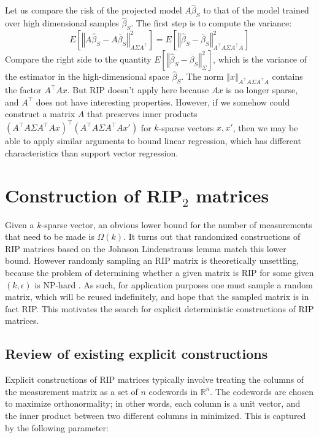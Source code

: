 \documentclass[english]{article}
\theoremstyle{plain}
\begin{document}
Let us compare the risk of the projected model $A\widehat{\beta}_{S}$ to that of the model trained over high dimensional samples $\widehat{\beta}_S$.
The first step is to compute the variance:
\[
E\left[\left\Vert A\widehat{\beta}_{S}-A\overline{\beta}_{S}\right\Vert _{A\Sigma A^{\top}}^{2}\right]=E\left[\left\Vert \widehat{\beta}_{S}-\overline{\beta}_{S}\right\Vert _{A^{\top}A\Sigma A^{\top}A}^{2}\right]
\] 
Compare the right side to the quantity $E\left[\left\Vert \widehat{\beta}_{S}-\overline{\beta}_{S}\right\Vert _{\Sigma}^{2}\right]$, which is the variance of the estimator in the high-dimensional space $\widehat{\beta}_S$.
The norm $\left\Vert x \right\Vert_{A^\top A \Sigma A^\top A}$ contains the factor $A^\top Ax$.
But RIP doesn't apply here because $Ax$ is no longer sparse, and $A^\top$ does not have interesting properties.
However, if we somehow could construct a matrix $A$ that preserves inner products $(A^{\top}A\Sigma A^{\top}Ax)^\top(A^{\top}A\Sigma A^{\top}Ax')$ for $k$-sparse vectors $x,x'$, then we may be able to apply similar arguments to bound linear regression, which has different characteristics than support vector regression.

\section{Construction of RIP$_2$ matrices}

Given a $k$-sparse vector, an obvious lower bound for the number of measurements that need to be made is $\Omega(k)$. It turns out that randomized constructions of RIP matrices based on the Johnson Lindenstrauss lemma match this lower bound. However randomly sampling an RIP matrix is theoretically unsettling, because the problem of determining whether a given matrix is RIP for some given $(k,\epsilon)$ is NP-hard \cite{Bandeira12}. As such, for application purposes one must sample a random matrix, which will be reused indefinitely, and hope that the sampled matrix is in fact RIP. This motivates the search for explicit deterministic constructions of RIP matrices. 

\subsection{Review of existing explicit constructions}
Explicit constructions of RIP matrices typically involve treating the columns of the measurement matrix as a set of $n$ codewords in $\mathbb{R}^n$. The codewords are chosen to maximize orthonormality; in other words, each column is a unit vector, and the inner product between two different columns in minimized. This is captured by the following parameter:
\end{document}
